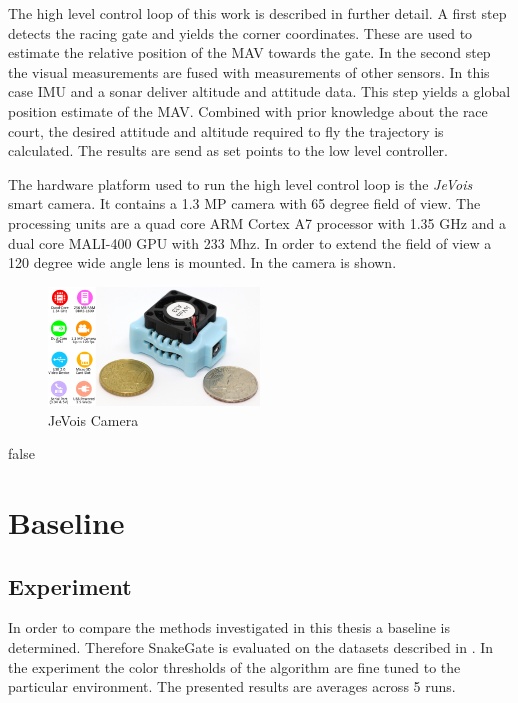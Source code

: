 The high level control loop of this work is described in further detail. A first step detects the racing gate and yields the corner coordinates. These are used to estimate the relative position of the \ac{MAV} towards the gate. In the second step the visual measurements are fused with measurements of other sensors. In this case \ac{IMU} and a sonar deliver altitude and attitude data. This step yields a global position estimate of the \ac{MAV}. Combined with prior knowledge about the race court, the desired attitude and altitude required to fly the trajectory is calculated. The results are send as set points to the low level controller.

The hardware platform used to run the high level control loop is the \textit{JeVois} smart camera. It contains a 1.3 MP camera with 65 degree field of view. The processing units are a quad core ARM Cortex A7 processor with 1.35 GHz and a dual core MALI-400 GPU with 233 Mhz. In order to extend the field of view a 120 degree wide angle lens is mounted. In  the camera is shown.

\begin{figure}[hbtp]
	\centering
	\includegraphics[width=0.5\textwidth]{fig/jevois}
	\caption{JeVois Camera}
	\label{fig:jevois}
\end{figure}



\if false
\section{Baseline}


\subsection{Experiment}

In order to compare the methods investigated in this thesis a baseline is determined. Therefore SnakeGate is evaluated on the datasets described in . In the experiment the color thresholds of the algorithm are fine tuned to the particular environment. The presented results are averages across 5 runs.


